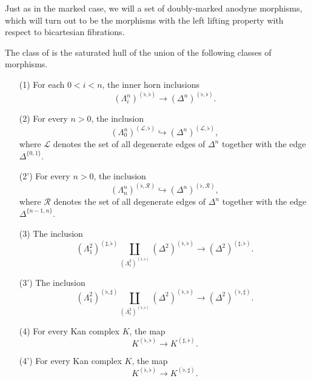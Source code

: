 \documentclass[main.tex]{subfiles}
\begin{document}
Just as in the marked case, we will a set of doubly-marked anodyne morphisms, which will turn out to be the morphisms with the left lifting property with respect to bicartesian fibrations.

\begin{definition}
  \label{def:doubly_marked_anodyne_morphisms}
  The class of  is the saturated hull of the union of the following classes of morphisms.
  \begin{enumerate}
    \item[(1)] For each $0  < i < n$, the inner horn inclusions
      \begin{equation*}
        (\Lambda^{n}_{i})^{(\flat, \flat)} \to (\Delta^{n})^{(\flat, \flat)}.
      \end{equation*}

    \item[(2)] For every $n > 0$, the inclusion
      \begin{equation*}
        (\Lambda^{n}_{0})^{(\mathcal{L}, \flat)} \hookrightarrow (\Delta^{n})^{(\mathcal{L}, \flat)},
      \end{equation*}
      where $\mathcal{L}$ denotes the set of all degenerate edges of $\Delta^{n}$ together with the edge $\Delta^{\{0, 1\}}$.

    \item[(2')] For every $n > 0$, the inclusion
      \begin{equation*}
        (\Lambda^{n}_{n})^{(\flat, \mathcal{R})} \hookrightarrow (\Delta^{n})^{(\flat, \mathcal{R})},
      \end{equation*}
      where $\mathcal{R}$ denotes the set of all degenerate edges of $\Delta^{n}$ together with the edge $\Delta^{\{n-1, n\}}$.

    \item[(3)] The inclusion
      \begin{equation*}
        (\Lambda^{2}_{1})^{(\sharp, \flat)} \coprod_{(\Lambda^{2}_{1})^{(\flat, \flat)}} (\Delta^{2})^{(\flat, \flat)} \to (\Delta^{2})^{(\sharp, \flat)}.
      \end{equation*}

    \item[(3')] The inclusion
      \begin{equation*}
        (\Lambda^{2}_{1})^{(\flat, \sharp)} \coprod_{(\Lambda^{2}_{1})^{(\flat, \flat)}} (\Delta^{2})^{(\flat, \flat)} \to (\Delta^{2})^{(\flat, \sharp)}.
      \end{equation*}

    \item[(4)] For every Kan complex $K$, the map
      \begin{equation*}
        K^{(\flat, \flat)} \to K^{(\sharp, \flat)}.
      \end{equation*}

    \item[(4')] For every Kan complex $K$, the map
      \begin{equation*}
        K^{(\flat, \flat)} \to K^{(\flat, \sharp)}.
      \end{equation*}
  \end{enumerate}
\end{definition}
\end{document}
